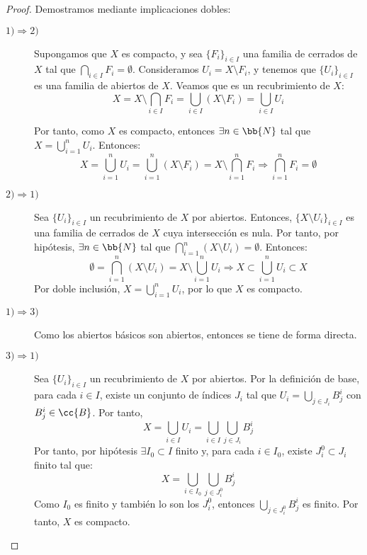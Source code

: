 \begin{proof} Demostramos mediante implicaciones dobles:
    \begin{description}
        \item[$1)\Longrightarrow 2)$] Supongamos que $X$ es compacto, y sea $\{F_i\}_{i\in I}$ una familia de cerrados de $X$ tal que $\bigcap\limits_{i\in I}F_i=\emptyset$.
        Consideramos $U_i=X\setminus F_i$, y tenemos que $\{U_i\}_{i\in I}$ es una familia de abiertos de $X$. Veamos que es un recubrimiento de $X$:
        \begin{equation*}
            X=X\setminus \bigcap_{i\in I}F_i = \bigcup_{i\in I}(X\setminus F_i) = \bigcup_{i\in I}U_i
        \end{equation*}

        Por tanto, como $X$ es compacto, entonces $\exists n\in \bb{N}$ tal que $X=\bigcup\limits_{i=1}^n U_i$. Entonces:
        \begin{equation*}
            X = \bigcup_{i=1}^n U_i = \bigcup_{i=1}^n (X\setminus F_i) = X\setminus \bigcap_{i=1}^n F_i \Longrightarrow \bigcap_{i=1}^n F_i = \emptyset
        \end{equation*}

        \item[$2)\Longrightarrow 1)$] Sea $\{U_i\}_{i\in I}$ un recubrimiento de $X$ por abiertos. Entonces, $\{X\setminus U_i\}_{i\in I}$ es una familia de cerrados de $X$ cuya intersección es nula.
        Por tanto, por hipótesis, $\exists n\in \bb{N}$ tal que $\bigcap\limits_{i=1}^n (X\setminus U_i)=\emptyset$. Entonces:
        \begin{equation*}
            \emptyset = \bigcap_{i=1}^n (X\setminus U_i) = X\setminus \bigcup_{i=1}^n U_i \Longrightarrow X \subset \bigcup_{i=1}^n U_i \subset X
        \end{equation*}
        Por doble inclusión, $X=\bigcup\limits_{i=1}^n U_i$, por lo que $X$ es compacto.

        \item[$1)\Longrightarrow 3)$] Como los abiertos básicos son abiertos, entonces se tiene de forma directa.
        
        \item[$3)\Longrightarrow 1)$] Sea $\{U_i\}_{i\in I}$ un recubrimiento de $X$ por abiertos. Por la definición de base, para cada $i\in I$, existe un
        conjunto de índices $J_i$ tal que $U_i=\bigcup\limits_{j\in J_i}B^i_j$ con $B^i_j\in \cc{B}$. Por tanto,
        \begin{equation*}
            X = \bigcup_{i\in I} U_i = \bigcup_{i\in I} \bigcup_{j\in J_i} B^i_j
        \end{equation*}
        Por tanto, por hipótesis $\exists I_0\subset I$ finito y, para cada $i\in I_0$, existe $J^0_i\subset J_i$ finito tal que:
        \begin{equation*}
            X = \bigcup_{i\in I_0} \bigcup_{j\in J^0_i} B^i_j
        \end{equation*}
        Como $I_0$ es finito y también lo son los $J^0_i$, entonces $\bigcup\limits_{j\in J^0_i} B^i_j$ es finito. Por tanto, $X$ es compacto.
    \end{description}
\end{proof}


